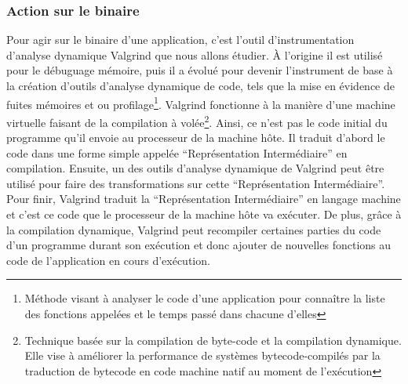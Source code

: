 \subsubsection{Action sur le binaire}
Pour agir sur le binaire d'une application, c'est l'outil d'instrumentation
d'analyse dynamique Valgrind\citet{INTERCEPTIONValgrind,
  INTERCEPTIONValgrindweb} que nous allons étudier. À l'origine il est utilisé
pour le débuguage mémoire, puis il a évolué pour devenir l'instrument de base à
la création d'outils d'analyse dynamique de code, tels que la mise en évidence
de fuites mémoires et ou profilage\footnote{Méthode visant à analyser le code
  d'une application pour connaître la liste des fonctions appelées et le temps
  passé dans chacune d'elles}. Valgrind fonctionne à la manière d'une machine
virtuelle faisant de la compilation à volée\footnote{Technique basée sur la
  compilation de byte-code et la compilation dynamique. Elle vise à améliorer la
  performance de systèmes bytecode-compilés par la traduction de bytecode en
  code machine natif au moment de l'exécution}. Ainsi, ce n'est pas le code
initial du programme qu'il envoie au processeur de la machine hôte. Il traduit
d'abord le code dans une forme simple appelée ``Représentation Intermédiaire''
en compilation. Ensuite, un des outils d'analyse dynamique de Valgrind peut être
utilisé pour faire des transformations sur cette ``Représentation
Intermédiaire''. Pour finir, Valgrind traduit la ``Représentation
Intermédiaire'' en langage machine et c'est ce code que le processeur de la
machine hôte va exécuter. De plus, grâce à la compilation dynamique, Valgrind
peut recompiler certaines parties du code d'un programme durant son exécution et
donc ajouter de nouvelles fonctions au code de l'application en cours
d'exécution.


